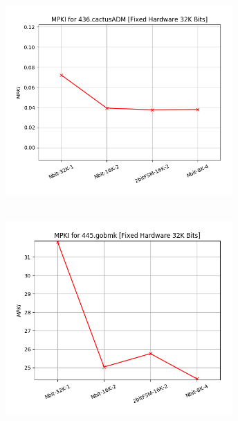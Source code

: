    \begin{minipage}{\textwidth}
      \begin{center}
         \\
         \vspace{3mm}
         \includegraphics[width=0.65\textwidth, frame]{./graphs/4-2ii/436-cactusADM.png}
         \vspace{6mm}
      \end{center}
   \end{minipage}

   \begin{minipage}{\textwidth}
      \begin{center}
         \\
         \vspace{3mm}
         \includegraphics[width=0.65\textwidth, frame]{./graphs/4-2ii/445-gobmk.png}
         \vspace{6mm}
      \end{center}
   \end{minipage}

